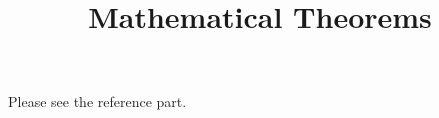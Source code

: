 \documentclass{amsart}
\begin{document}

\title{Mathematical Theorems}
\maketitle 
Please see the reference part. 

\nocite{Ca15C} 
\nocite{*}


\end{document}
